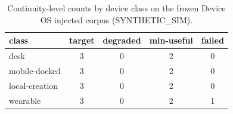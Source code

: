 \begin{table}[h]
\centering
\caption{Continuity-level counts by device class on the frozen Device OS injected corpus (SYNTHETIC\_SIM).}
\begin{tabular}{lcccc}\toprule
class & target & degraded & min-useful & failed \\\midrule
desk & 3 & 0 & 2 & 0 \\
mobile-docked & 3 & 0 & 2 & 0 \\
local-creation & 3 & 0 & 2 & 0 \\
wearable & 3 & 0 & 2 & 1 \\
\bottomrule\end{tabular}
\end{table}
